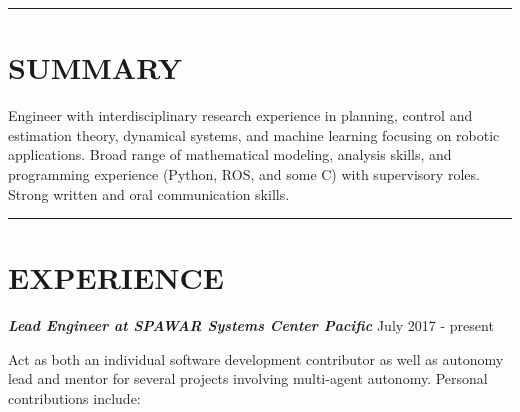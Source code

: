 \documentclass{res}
\begin{document}

 
\begin{resume}

%
%

 \vspace*{-2ex}
\hspace{-8.5ex}\rule{16.5cm}{0.4pt}
 \vspace*{-3ex}
\section{SUMMARY}
\vspace{1ex}
Engineer with interdisciplinary research experience in planning, control and estimation theory, dynamical systems, and machine learning focusing on robotic applications.  Broad range of mathematical modeling, analysis skills, and programming experience (Python, ROS, and some C) with supervisory roles. Strong written and oral communication skills.

 \vspace*{-4ex}
\hspace{-8.5ex}\rule{16.5cm}{0.4pt}
 \vspace*{-3ex}
\section{EXPERIENCE}
{\sl \bf Lead Engineer at SPAWAR Systems Center Pacific} \hfill July 2017 - present

\vspace*{-3ex}
 Act as both an individual software development contributor as well as autonomy lead and mentor for several projects involving multi-agent autonomy.  Personal contributions include:


\end{resume}
\end{document}
